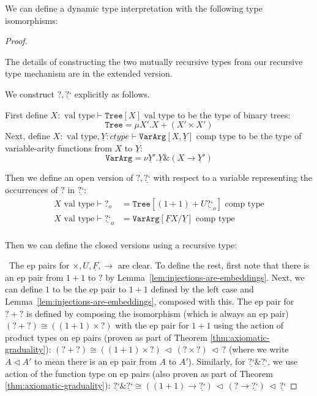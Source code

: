\documentclass[acmsmall,nonacm]{acmart}
\renewcommand{\u}{\underline}
\newcommand{\vtype}{\,\,\text{val type}}
\newcommand{\ctype}{\,\,\text{comp type}}
\newcommand{\dynv}{{?}}
\newcommand{\dync}{\u {\text{?`}}}
\newcommand{\with}{\mathbin{\&}}
\begin{document}
\begin{definition} \label{def:scheme-like-type-interp}
  We can define a dynamic type interpretation with the following type
  isomorphisms:
\end{definition}
\begin{proof}
  \begin{shortonly}
    The details of constructing the two mutually recursive types from
    our recursive type mechanism are in the extended version. 
  \end{shortonly}
  \begin{longonly}
  We construct $\dynv, \dync$ explicitly as follows.

  First define $X : \vtype \vdash \texttt{Tree}[X] \vtype$ to be the
  type of binary trees:
  \[ \texttt{Tree} = \mu X'. X + (X' \times X') \]
  Next, define $X:\vtype, \u Y: ctype \vdash \texttt{VarArg}[X,\u Y]
  \ctype$ to be the type of variable-arity functions from $X$ to $\u
  Y$:
  \[ \texttt{VarArg} = \nu \u Y'. \u Y \with (X \to \u Y') \]

  Then we define an open version of $\dynv, \dync$ with respect to a
  variable representing the occurrences of $\dynv$ in $\dync$:
  \begin{align*}
    X \vtype \vdash \dynv_o &= \texttt{Tree}[(1+1) + U \dync_o] \ctype\\
    X \vtype \vdash \dync_o &= \texttt{VarArg}[\u F X/\u Y] \ctype\\
  \end{align*}

  Then we can define the closed versions using a recursive type:
  \end{longonly}
  \ The ep pairs for $\times, U,\u F, \to$ are clear.  To define the
  rest, first note that there is an ep pair from $1+1$ to $\dynv$ by
  Lemma~\ref{lem:injections-are-embeddings}.  Next, we can define $1$ to
  be the ep pair to $1+1$ defined by the left case and
  Lemma~\ref{lem:injections-are-embeddings}, composed with this.  The ep
  pair for $\dynv + \dynv$ is defined by composing the isomorphism
  (which is always an ep pair)
  $(\dynv + \dynv) \cong ((1+1) \times \dynv)$ with the ep pair for
  $1+1$ using the action of product types on ep pairs (proven as part of
  Theorem \ref{thm:axiomatic-graduality}): $(\dynv + \dynv) \cong
  ((1+1)\times \dynv) \,\triangleleft\, (\dynv \times \dynv) \,\triangleleft\,
  \dynv$ (where we write $A \triangleleft A'$ to mean there is an ep
  pair from $A$ to $A'$).  Similarly, for $\dync \with \dync$, we use
  action of the function type on ep pairs (also proven as part of
  Theorem \ref{thm:axiomatic-graduality}): $\dync \with \dync \cong
  ((1+1) \to \dync) \,\triangleleft\, (\dynv \to \dync) \,\triangleleft\, \dync$
\end{proof}
\end{document}
